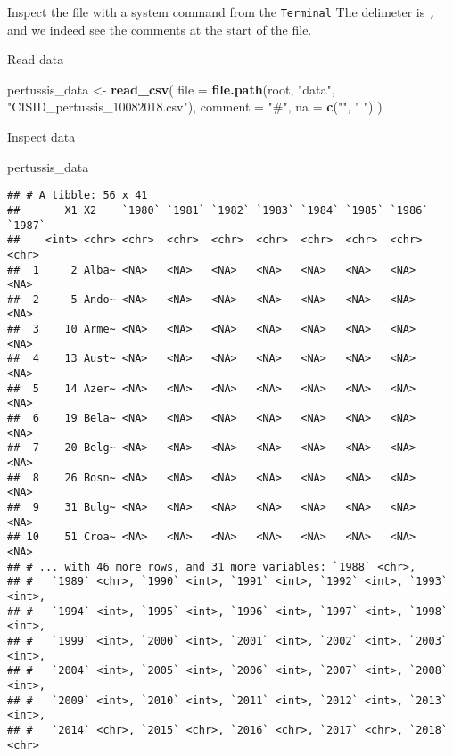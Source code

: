 \documentclass[ignorenonframetext,]{beamer}
\newenvironment{Shaded}{\begin{snugshade}}{\end{snugshade}}
\newcommand{\DataTypeTok}[1]{\textcolor[rgb]{0.13,0.29,0.53}{#1}}
\newcommand{\KeywordTok}[1]{\textcolor[rgb]{0.13,0.29,0.53}{\textbf{#1}}}
\newcommand{\NormalTok}[1]{#1}
\newcommand{\StringTok}[1]{\textcolor[rgb]{0.31,0.60,0.02}{#1}}
\begin{document}
\begin{frame}[fragile]
\begin{block}{Inspect the file with a system command from the
\texttt{Terminal}}
The delimeter is \texttt{,} and we indeed see the comments at the start
of the file.

\end{block}

\begin{block}{Read data}

\begin{Shaded}
\begin{Highlighting}[]
\NormalTok{pertussis_data <-}\StringTok{ }\KeywordTok{read_csv}\NormalTok{(}
  \DataTypeTok{file =} \KeywordTok{file.path}\NormalTok{(root, }
                  \StringTok{"data"}\NormalTok{, }
                  \StringTok{"CISID_pertussis_10082018.csv"}\NormalTok{),}
                           \DataTypeTok{comment =} \StringTok{"#"}\NormalTok{, }
                           \DataTypeTok{na =} \KeywordTok{c}\NormalTok{(}\StringTok{""}\NormalTok{, }\StringTok{" "}\NormalTok{)}
\NormalTok{  )}
\end{Highlighting}
\end{Shaded}

\end{block}

\begin{block}{Inspect data}

\begin{Shaded}
\begin{Highlighting}[]
\NormalTok{pertussis_data}
\end{Highlighting}
\end{Shaded}

\begin{verbatim}
## # A tibble: 56 x 41
##       X1 X2    `1980` `1981` `1982` `1983` `1984` `1985` `1986` `1987`
##    <int> <chr> <chr>  <chr>  <chr>  <chr>  <chr>  <chr>  <chr>  <chr> 
##  1     2 Alba~ <NA>   <NA>   <NA>   <NA>   <NA>   <NA>   <NA>   <NA>  
##  2     5 Ando~ <NA>   <NA>   <NA>   <NA>   <NA>   <NA>   <NA>   <NA>  
##  3    10 Arme~ <NA>   <NA>   <NA>   <NA>   <NA>   <NA>   <NA>   <NA>  
##  4    13 Aust~ <NA>   <NA>   <NA>   <NA>   <NA>   <NA>   <NA>   <NA>  
##  5    14 Azer~ <NA>   <NA>   <NA>   <NA>   <NA>   <NA>   <NA>   <NA>  
##  6    19 Bela~ <NA>   <NA>   <NA>   <NA>   <NA>   <NA>   <NA>   <NA>  
##  7    20 Belg~ <NA>   <NA>   <NA>   <NA>   <NA>   <NA>   <NA>   <NA>  
##  8    26 Bosn~ <NA>   <NA>   <NA>   <NA>   <NA>   <NA>   <NA>   <NA>  
##  9    31 Bulg~ <NA>   <NA>   <NA>   <NA>   <NA>   <NA>   <NA>   <NA>  
## 10    51 Croa~ <NA>   <NA>   <NA>   <NA>   <NA>   <NA>   <NA>   <NA>  
## # ... with 46 more rows, and 31 more variables: `1988` <chr>,
## #   `1989` <chr>, `1990` <int>, `1991` <int>, `1992` <int>, `1993` <int>,
## #   `1994` <int>, `1995` <int>, `1996` <int>, `1997` <int>, `1998` <int>,
## #   `1999` <int>, `2000` <int>, `2001` <int>, `2002` <int>, `2003` <int>,
## #   `2004` <int>, `2005` <int>, `2006` <int>, `2007` <int>, `2008` <int>,
## #   `2009` <int>, `2010` <int>, `2011` <int>, `2012` <int>, `2013` <int>,
## #   `2014` <chr>, `2015` <chr>, `2016` <chr>, `2017` <chr>, `2018` <chr>
\end{verbatim}


\end{block}
\end{frame}
\end{document}
